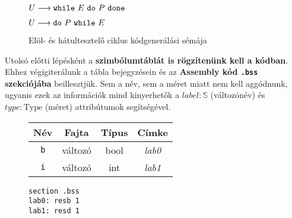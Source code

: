 \begin{figure}[h]
	\begin{minipage}{0.5\linewidth}
		\begin{stuki*}[5cm]{$U \longrightarrow  \texttt{while} ~ E ~ \texttt{do} ~ P ~ \texttt{done}$}
		\end{stuki*}
	\end{minipage}
	\begin{minipage}{0.5\linewidth}
		\begin{stuki*}[5cm]{$U \longrightarrow  \texttt{do} ~ P ~ \texttt{while} ~ E$}
		\end{stuki*}
	\end{minipage}
	\caption{Elöl- és hátultesztelő ciklus kódgenerálási sémája}
\end{figure}

\pagebreak

Utolsó előtti lépésként a \textbf{szimbólumtáblát is rögzítenünk kell a kódban}. Ehhez végigiterálunk a tábla bejegyzésein és az \textbf{Assembly kód \texttt{.bss} szekciójába} beillesztjük. Sem a név, sem a méret miatt nem kell aggódnunk, ugyanis ezek az információk mind kinyerhetők a $label:\mathbb{S}$ (változónév) és $type:\text{Type}$ (méret) attribútumok segítségével.

\begin{figure}[h]
	\centering
	\begin{minipage}{0.5\linewidth}
		\begin{tabular}{|c|c|c|c|}
			\hline
			\textbf{Név} & \textbf{Fajta} & \textbf{Típus} & \textbf{Címke} \\
			\hline\hline
			\texttt{b} & változó & bool & \textit{lab0} \\
			\hline
			\texttt{i} & változó & int & \textit{lab1} \\
			\hline
		\end{tabular}
	\end{minipage}
	\begin{minipage}{0.3\linewidth}
		\begin{lstlisting}[style=asmstyle]
section .bss
lab0: resb 1
lab1: resd 1
		\end{lstlisting}
	\end{minipage}
\end{figure}

